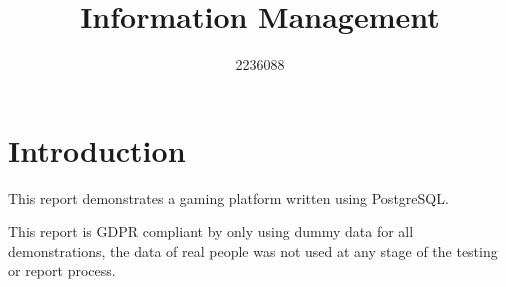 \documentclass[english]{article}
\begin{document}
\title{Information Management}
\author{2236088}

\maketitle

\newpage

\tableofcontents{}

\newpage

\section{Introduction}

This report demonstrates a gaming platform written using PostgreSQL.

This report is GDPR compliant by only using dummy data for all demonstrations, the data of real people was not used at any stage of the testing or report process.



\newpage

\printbibliography

\newpage

\begin{appendices}


\end{appendices}
\end{document}
